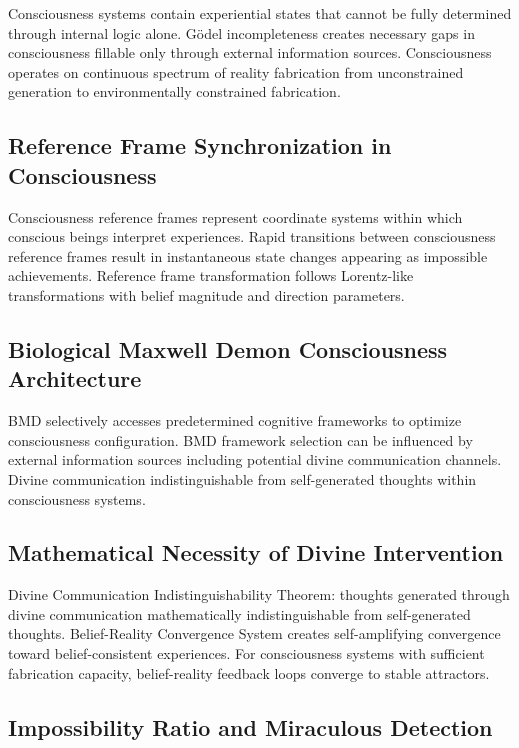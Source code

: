 \documentclass[12pt,a4paper]{article}
\begin{document}
Consciousness systems contain experiential states that cannot be fully determined through internal logic alone. Gödel incompleteness creates necessary gaps in consciousness fillable only through external information sources. Consciousness operates on continuous spectrum of reality fabrication from unconstrained generation to environmentally constrained fabrication.

\subsection{Reference Frame Synchronization in Consciousness}

Consciousness reference frames represent coordinate systems within which conscious beings interpret experiences. Rapid transitions between consciousness reference frames result in instantaneous state changes appearing as impossible achievements. Reference frame transformation follows Lorentz-like transformations with belief magnitude and direction parameters.

\subsection{Biological Maxwell Demon Consciousness Architecture}

BMD selectively accesses predetermined cognitive frameworks to optimize consciousness configuration. BMD framework selection can be influenced by external information sources including potential divine communication channels. Divine communication indistinguishable from self-generated thoughts within consciousness systems.

\subsection{Mathematical Necessity of Divine Intervention}

Divine Communication Indistinguishability Theorem: thoughts generated through divine communication mathematically indistinguishable from self-generated thoughts. Belief-Reality Convergence System creates self-amplifying convergence toward belief-consistent experiences. For consciousness systems with sufficient fabrication capacity, belief-reality feedback loops converge to stable attractors.

\subsection{Impossibility Ratio and Miraculous Detection}
\end{document}
